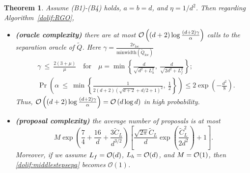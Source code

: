 \documentclass[11pt,letterpaper]{article}
\newcommand{\ball}{\mathrm{B}}
\newcommand{\local}{\mathrm{loc}}
\newcommand{\Q}{\widetilde{Q}}
\newcommand{\rin}{r_{\mathrm{in}}}
\newtheorem{theorem}[thm]{Theorem}
\begin{document}
\begin{theorem}
\label{dolif:theo:separation}
Assume (B1)-(B4) holds, $a=b=d$, and $\eta =1/d^2$. Then regarding Algorithm~\ref{dolif:RGO}, 
\begin{itemize}
\item[(a)] \textbf{(oracle complexity)} there are at most ${\cal O} \left((d+2) \log \frac{(d+2) \gamma}{\alpha}\right)$ calls to the separation oracle of
$\Q$. Here $\gamma=\frac{2r_{\local}}{\mbox{minwidth}(\Q_{\local})}$
\begin{align*}
&\gamma\ \le\ \frac{2(3+\mu)}{\mu}
\quad\text{for}\quad
\mu=\min\left\{\frac{d}{\sqrt{d^2+L_h^2}},\ \frac{d}{\sqrt{2d^2+L_f^2}}\right\};\\
&\Pr \left(
\alpha\ \le\
\min\left\{
\frac{1}{2(d+2) (\sqrt{d+2}+d/2+1)^2},\ \frac{1}{2}
\right\}
\right)
\le 2\exp \left(-\frac{d^2}{8}\right).
\end{align*}
Thus, ${\cal O} \left((d+2) \log \frac{(d+2) \gamma}{\alpha}\right)={\cal O} \left(d\log d \right)$ in high probability. 
\item[(b)] \textbf{(proposal complexity)} the average number of proposals is at most 
\begin{equation}\label{dolif:middlestepsepa}
    M \exp\!\left(\frac74+\frac{16}{d}+ \frac{3\widetilde{C}_L}{d^{3/2}}\right)
\left[
\frac{\sqrt{2\pi} \widetilde C_L}{d} \exp\!\left(\frac{ \widetilde C_L^2}{2d^2}\right)
+1 \right].
\end{equation}
Moreover, if we assume $L_f={\cal O}(d)$, $L_h={\cal O}(d)$, and $M={\cal O}(1)$, then \eqref{dolif:middlestepsepa} becomes $\mathcal{O}(1)$. 
\end{itemize}
\end{theorem}


\end{document}
